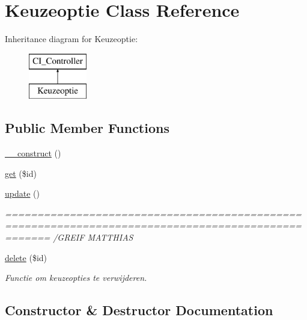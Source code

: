 \hypertarget{class_keuzeoptie}{}\section{Keuzeoptie Class Reference}
\label{class_keuzeoptie}
Inheritance diagram for Keuzeoptie\+:\begin{figure}[H]
\begin{center}
\leavevmode
\includegraphics[height=2.000000cm]{class_keuzeoptie}
\end{center}
\end{figure}
\subsection*{Public Member Functions}
\begin{DoxyCompactItemize}
\item 
\mbox{\hyperlink{class_keuzeoptie_a095c5d389db211932136b53f25f39685}{\+\_\+\+\_\+construct}} ()
\item 
\mbox{\hyperlink{class_keuzeoptie_a50e3bfb586b2f42932a6a93f3fbb0828}{get}} (\$id)
\item 
\mbox{\hyperlink{class_keuzeoptie_a842e4774e3b3601a005b995c02f7e883}{update}} ()
\begin{DoxyCompactList}\small\item\em =================================================================================================== /\+G\+R\+E\+IF M\+A\+T\+T\+H\+I\+AS \end{DoxyCompactList}\item 
\mbox{\hyperlink{class_keuzeoptie_a2f8258add505482d7f00ea26493a5723}{delete}} (\$id)
\begin{DoxyCompactList}\small\item\em Functie om keuzeopties te verwijderen. \end{DoxyCompactList}\end{DoxyCompactItemize}


\subsection{Constructor \& Destructor Documentation}
\mbox{\label{class_keuzeoptie_a095c5d389db211932136b53f25f39685}} 
